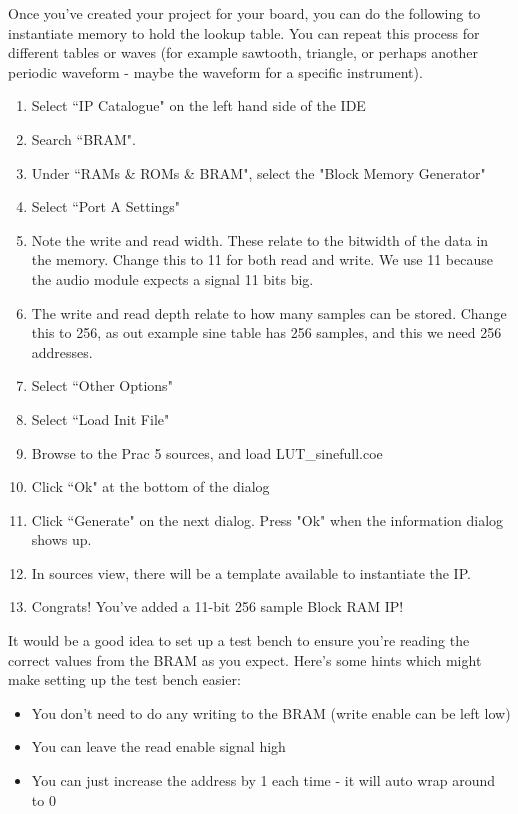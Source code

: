 Once you've created your project for your board, you can do the following to instantiate memory to hold the lookup table. You can repeat this process for different tables or waves (for example sawtooth, triangle, or perhaps another periodic waveform - maybe the waveform for a specific instrument).
\begin{enumerate}
    \item Select ``IP Catalogue" on the left hand side of the IDE
    \item Search ``BRAM".
    \item Under ``RAMs \& ROMs \& BRAM", select the "Block Memory Generator"
    \item Select ``Port A Settings"
    \item Note the write and read width. These relate to the bitwidth of the data in the memory. Change this to 11 for both read and write. We use 11 because the audio module expects a signal 11 bits big.
    \item The write and read depth relate to how many samples can be stored. Change this to 256, as out example sine table has 256 samples, and this we need 256 addresses.
    \item Select ``Other Options"
    \item Select ``Load Init File"
    \item Browse to the Prac 5 sources, and load LUT\_sinefull.coe
    \item Click ``Ok" at the bottom of the dialog
    \item Click ``Generate" on the next dialog. Press "Ok" when the information dialog shows up.
    \item In sources view, there will be a template available to instantiate the IP.
    \item Congrats! You've added a 11-bit 256 sample Block RAM IP!
\end{enumerate}

It would be a good idea to set up a test bench to ensure you're reading the correct values from the BRAM as you expect. Here's some hints which might make setting up the test bench easier:
\begin{itemize}
    \item You don't need to do any writing to the BRAM (write enable can be left low)
    \item You can leave the read enable signal high
    \item You can just increase the address by 1 each time - it will auto wrap around to 0
\end{itemize}

